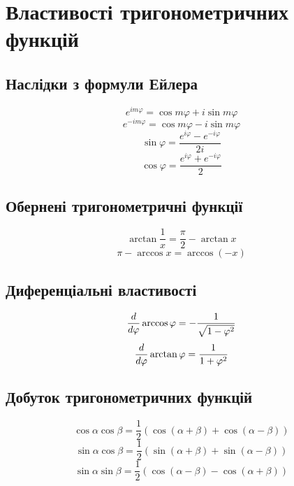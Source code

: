 \chapter{Властивості тригонометричних функцій}
\label{ch:trigonometric}

\section{Наслідки з формули Ейлера}
%
\begin{equation}
e^{im \varphi} = \cos m \varphi + i \sin m \varphi
\end{equation}
%
\begin{equation}
e^{-im \varphi} = \cos m \varphi - i \sin m \varphi
\end{equation}
%
\begin{equation}
\sin \varphi = \frac{e^{i \varphi} - e^{- i \varphi}}{2i}
\end{equation}
%
\begin{equation}
\cos \varphi = \frac{e^{i \varphi} + e^{- i \varphi}}{2}
\end{equation}
%
\section{Обернені тригонометричні функції}
%
\begin{equation}
\arctan \frac{1}{x} = \frac{\pi}{2} - \arctan x
\end{equation}
%
\begin{equation}
\pi - \arccos x = \arccos (-x)
\end{equation}
%
\section{Диференціальні властивості}
%
\begin{equation}
\frac{d }{d \varphi} \arccos \varphi = - \frac{1}{ \sqrt{1 - \varphi^2} }
\end{equation}
%
\begin{equation}
\frac{d }{d \varphi} \arctan \varphi = \frac{1}{1 + \varphi^2}
\end{equation}
%
\section{Добуток тригонометричних функцій}
%
\begin{equation}
\cos \alpha \cos \beta = \frac{1}{2} 
\left(  \cos (\alpha + \beta) + \cos (\alpha - \beta) \right)
\end{equation}
%
\begin{equation}
\sin \alpha \cos \beta = \frac{1}{2} 
\left( \sin (\alpha + \beta) + \sin (\alpha - \beta) \right)
\end{equation}
%
\begin{equation}
\sin \alpha \sin \beta = \frac{1}{2} 
\left( \cos (\alpha - \beta) - \cos (\alpha + \beta) \right)
\end{equation}
%
